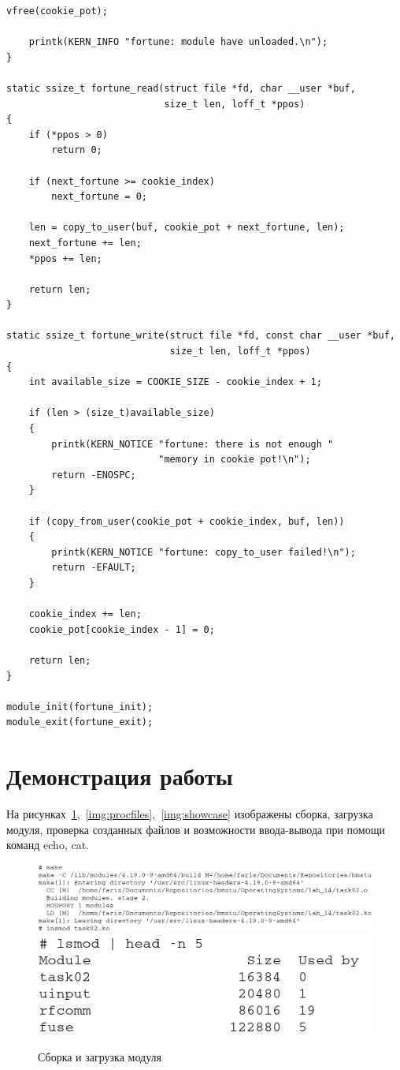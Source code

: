 \begin{lstlisting}[caption={Задание \textnumero2},label={lst:task02}]
    vfree(cookie_pot);

    printk(KERN_INFO "fortune: module have unloaded.\n");
}

static ssize_t fortune_read(struct file *fd, char __user *buf,
                            size_t len, loff_t *ppos)
{
    if (*ppos > 0)
        return 0;

    if (next_fortune >= cookie_index)
        next_fortune = 0;

    len = copy_to_user(buf, cookie_pot + next_fortune, len);
    next_fortune += len;
    *ppos += len;

    return len;
}

static ssize_t fortune_write(struct file *fd, const char __user *buf,
                             size_t len, loff_t *ppos)
{
    int available_size = COOKIE_SIZE - cookie_index + 1;

    if (len > (size_t)available_size)
    {
        printk(KERN_NOTICE "fortune: there is not enough "
                           "memory in cookie pot!\n");
        return -ENOSPC;
    }

    if (copy_from_user(cookie_pot + cookie_index, buf, len))
    {
        printk(KERN_NOTICE "fortune: copy_to_user failed!\n");
        return -EFAULT;
    }

    cookie_index += len;
    cookie_pot[cookie_index - 1] = 0;

    return len;
}

module_init(fortune_init);
module_exit(fortune_exit);
\end{lstlisting}

\section{Демонстрация работы}

На рисунках~\ref{img:moduleload},~\ref{img:procfiles},~\ref{img:showcase} изображены сборка, загрузка модуля, проверка созданных файлов и возможности ввода-вывода при помощи команд echo, cat.

\begin{figure}[H]
    \includegraphics[scale=0.4]{images/moduleload.png}
    \includegraphics[scale=0.4]{images/lsmod.png}
    \caption{Сборка и загрузка модуля}\label{img:moduleload}
\end{figure}

